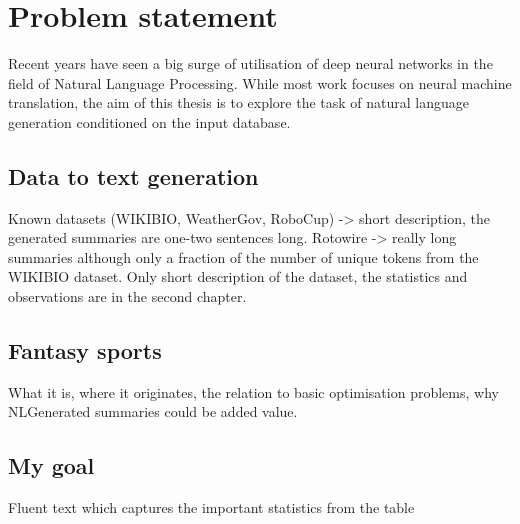 \chapter{Problem statement}
Recent years have seen a big surge of utilisation of deep neural networks in the field of Natural Language Processing. While most work focuses on neural machine translation, the aim of this thesis is to explore the task of natural language generation conditioned on the input database.

\section{Data to text generation}
Known datasets (WIKIBIO, WeatherGov, RoboCup) -> short description, the generated summaries are one-two sentences long. Rotowire -> really long summaries although only a fraction of the number of unique tokens from the WIKIBIO dataset. Only short description of the dataset, the statistics and observations are in the second chapter.

\section{Fantasy sports}
What it is, where it originates, the relation to basic optimisation problems, why NLGenerated summaries could be added value.

\section{My goal}
Fluent text which captures the important statistics from the table
